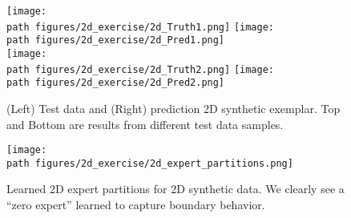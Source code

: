 \begin{figure}[htpb!]
    \centering
        \texttt{[image: \\path figures/2d\_exercise/2d\_Truth1.png]}
        \hspace{.1in}  %
        \texttt{[image: \\path figures/2d\_exercise/2d\_Pred1.png]}
        \hfill \\
        \texttt{[image: \\path figures/2d\_exercise/2d\_Truth2.png]}
        \hspace{.1in}  %
        \texttt{[image: \\path figures/2d\_exercise/2d\_Pred2.png]}
    \caption{(Left) Test data and (Right) prediction 2D synthetic exemplar. Top and Bottom are results from different test data samples.}
    \label{fig:Truth_Pred2d}
\end{figure}

\begin{figure}[H]
    \centering
    \texttt{[image: \\path figures/2d\_exercise/2d\_expert\_partitions.png]}
    \caption{Learned 2D expert partitions for 2D synthetic data. We clearly see a ``zero expert'' learned to capture boundary behavior.}
    \label{fig:2d_expert_partitions}
\end{figure}
